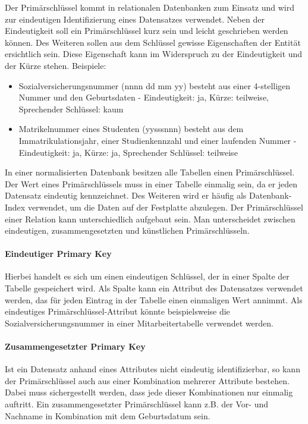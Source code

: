 Der Primärschlüssel kommt in relationalen Datenbanken zum Einsatz und wird zur eindeutigen Identifizierung eines Datensatzes verwendet. Neben der Eindeutigkeit soll ein Primärschlüssel kurz sein und leicht geschrieben werden können. Des Weiteren sollen aus dem Schlüssel gewisse Eigenschaften der Entität ersichtlich sein. Diese Eigenschaft kann im Widerspruch zu der Eindeutigkeit und der Kürze stehen. 
Beispiele:
\begin{itemize}
    \item Sozialversicherungsnummer (nnnn dd mm yy) besteht aus einer 4-stelligen Nummer und den Geburtsdaten - Eindeutigkeit: ja, Kürze: teilweise, Sprechender Schlüssel: kaum
    \item Matrikelnummer eines Studenten (yysssnnn) besteht aus dem Immatrikulationsjahr, einer Studienkennzahl und einer laufenden Nummer - Eindeutigkeit: ja, Kürze: ja, Sprechender Schlüssel: teilweise
\end{itemize}

In einer normalisierten Datenbank besitzen alle Tabellen einen Primärschlüssel.
Der Wert eines Primärschlüssels muss in einer Tabelle einmalig sein, da er jeden Datensatz eindeutig kennzeichnet. Des Weiteren wird er häufig als Datenbank-Index verwendet, um die Daten auf der Festplatte abzulegen. Der Primärschlüssel einer Relation kann unterschiedlich aufgebaut sein. Man unterscheidet zwischen eindeutigen, zusammengesetzten und künstlichen Primärschlüsseln.

\paragraph{Eindeutiger Primary Key}
Hierbei handelt es sich um einen eindeutigen Schlüssel, der in einer Spalte der Tabelle gespeichert wird. Als Spalte kann ein Attribut des Datensatzes verwendet werden, das für jeden Eintrag in der Tabelle einen einmaligen Wert annimmt. Als eindeutiges Primärschlüssel-Attribut könnte beispielsweise die Sozialversicherungsnummer in einer Mitarbeitertabelle verwendet werden.

\paragraph{Zusammengesetzter Primary Key}
Ist ein Datensatz anhand eines Attributes nicht eindeutig identifizierbar, so kann der Primärschlüssel auch aus einer Kombination mehrerer Attribute bestehen. Dabei muss sichergestellt werden, dass jede dieser Kombinationen nur einmalig auftritt. Ein zusammengesetzter Primärschlüssel kann z.B. der Vor- und Nachname in Kombination mit dem Geburtsdatum sein.

